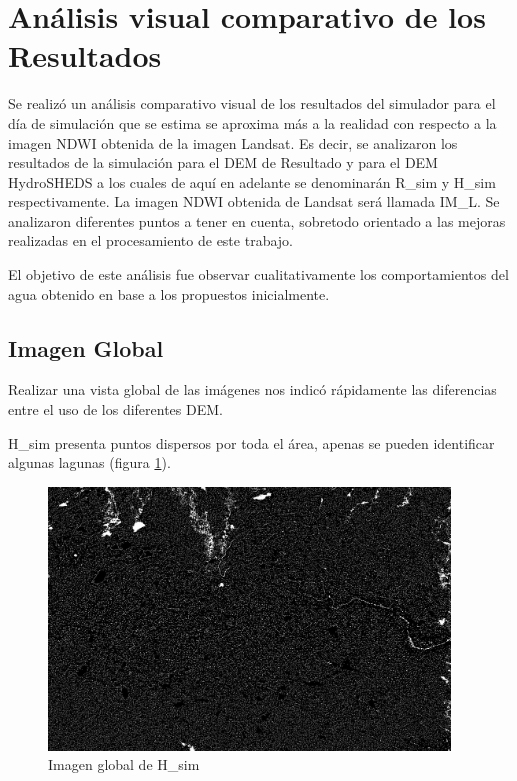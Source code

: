 \documentclass[10pt,a4paper, twoside]{report}
\begin{document}
\section{Análisis visual comparativo de los Resultados}
\label{analisisVisual}

Se realizó un análisis comparativo visual de los resultados del simulador para el día de simulación que se estima se aproxima más a la realidad con respecto a la imagen NDWI obtenida de la imagen Landsat. Es decir, se analizaron los resultados de la simulación para el DEM de Resultado y para el DEM HydroSHEDS a los cuales de aquí en adelante se denominarán R\_sim y H\_sim respectivamente. La imagen NDWI obtenida de Landsat será llamada IM\_L. Se analizaron diferentes puntos a tener en cuenta, sobretodo orientado a las mejoras realizadas en el procesamiento de este trabajo.

El objetivo de este análisis fue observar cualitativamente los comportamientos del agua obtenido en base a los propuestos inicialmente.

\subsection{Imagen Global}

Realizar una vista global de las imágenes nos indicó rápidamente las diferencias entre el uso de los diferentes DEM.


H\_sim presenta puntos dispersos por toda el área, apenas se pueden identificar algunas lagunas (figura \ref{HSHEDSGlobal}).

\begin{figure}[!htb]
   \centering      
   \includegraphics[width=0.95\textwidth]{imagenes/HSHEDSGlobal.jpg}
 \caption{Imagen global de H\_sim}
 \label{HSHEDSGlobal}
\end{figure}
\end{document}
